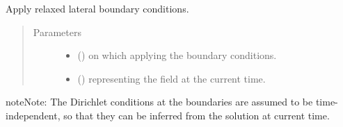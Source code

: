 \documentclass[letterpaper,10pt,english]{sphinxmanual}
\begin{document}
\begin{fulllineitems}
\begin{fulllineitems}
\begin{quote}
\begin{description}
\begin{itemize}
\end{itemize}

\end{description}\end{quote}

\end{fulllineitems}


\begin{fulllineitems}
\label{\detokenize{api:dycore.horizontal_boundary.Relaxed.apply}}
Apply relaxed lateral boundary conditions.
\begin{quote}\begin{description}
\item[{Parameters}] \leavevmode\begin{itemize}
\item {} 
 () \textendash{}  on which applying the boundary conditions.

\item {} 
 () \textendash{}  representing the field at the current time.

\end{itemize}

\end{description}\end{quote}

\begin{sphinxadmonition}{note}{Note:}
The Dirichlet conditions at the boundaries are assumed to be time-independent, so that they
can be inferred from the solution at current time.
\end{sphinxadmonition}

\end{fulllineitems}



\end{fulllineitems}
\end{document}
